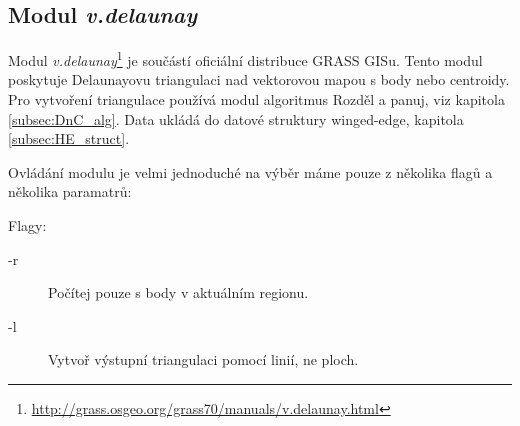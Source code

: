 \documentclass[12pt,a4paper]{article}
\begin{document}
{\newpage
\subsection{Modul \emph{v.delaunay}}
\label{subsec:v.delaunay}

Modul
\emph{v.delaunay}\footnote{\url{http://grass.osgeo.org/grass70/manuals/v.delaunay.html}}
je součástí oficiální distribuce GRASS GISu. Tento modul poskytuje
Delaunayovu triangulaci nad vektorovou mapou s body nebo
centroidy. Pro vytvoření triangulace používá modul algoritmus Rozděl a
panuj, viz kapitola \ref{subsec:DnC_alg}. Data ukládá do datové
struktury winged-edge, kapitola \ref{subsec:HE_struct}.

\begin{figure}[h!]
\centering
\begin{floatrow}
\end{floatrow}
\end{figure}

Ovládání modulu je velmi jednoduché na výběr máme pouze z několika
flagů a několika paramatrů:

\noindent Flagy:
\begin{description}
\item[-r] Počítej pouze s body v aktuálním regionu.
\item[-l] Vytvoř výstupní triangulaci pomocí linií, ne ploch.
\end{description}

}
\end{document}
